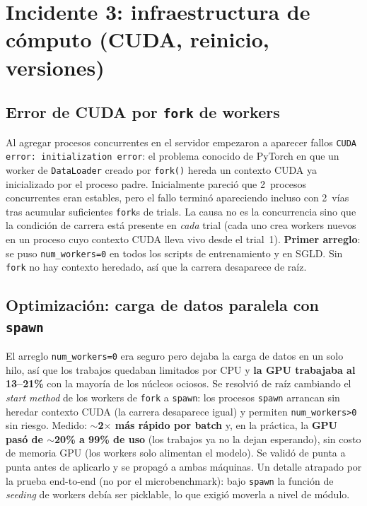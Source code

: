 \documentclass[12pt,a4paper]{article}
\begin{document}
\section{Incidente 3: infraestructura de cómputo (CUDA, reinicio, versiones)}

\subsection{Error de CUDA por \texttt{fork} de workers}

Al agregar procesos concurrentes en el servidor empezaron a aparecer fallos
\texttt{CUDA error: initialization error}: el problema conocido de PyTorch en
que un worker de \texttt{DataLoader} creado por \texttt{fork()} hereda un
contexto CUDA ya inicializado por el proceso padre. Inicialmente pareció que
2~procesos concurrentes eran estables, pero el fallo terminó apareciendo
incluso con 2~vías tras acumular suficientes \texttt{fork}s de trials. La
causa no es la concurrencia sino que la condición de carrera está presente en
\emph{cada} trial (cada uno crea workers nuevos en un proceso cuyo contexto
CUDA lleva vivo desde el trial~1). \textbf{Primer arreglo}: se puso
\texttt{num\_workers=0} en todos los scripts de entrenamiento y en SGLD.
Sin \texttt{fork} no hay contexto heredado, así que la carrera desaparece de
raíz.

\subsection{Optimización: carga de datos paralela con \texttt{spawn}}

El arreglo \texttt{num\_workers=0} era seguro pero dejaba la carga de datos en
un solo hilo, así que los trabajos quedaban limitados por CPU y \textbf{la GPU
trabajaba al 13--21\%} con la mayoría de los núcleos ociosos. Se resolvió de
raíz cambiando el \emph{start method} de los workers de \texttt{fork} a
\texttt{spawn}: los procesos \texttt{spawn} arrancan sin heredar contexto CUDA
(la carrera desaparece igual) y permiten \texttt{num\_workers>0} sin riesgo.
Medido: \textbf{$\sim$2$\times$ más rápido por batch} y, en la práctica, la
\textbf{GPU pasó de $\sim$20\% a 99\% de uso} (los trabajos ya no la dejan
esperando), sin costo de memoria GPU (los workers solo alimentan el modelo).
Se validó de punta a punta antes de aplicarlo y se propagó a ambas máquinas.
Un detalle atrapado por la prueba end-to-end (no por el microbenchmark): bajo
\texttt{spawn} la función de \emph{seeding} de workers debía ser picklable, lo
que exigió moverla a nivel de módulo.
\end{document}
